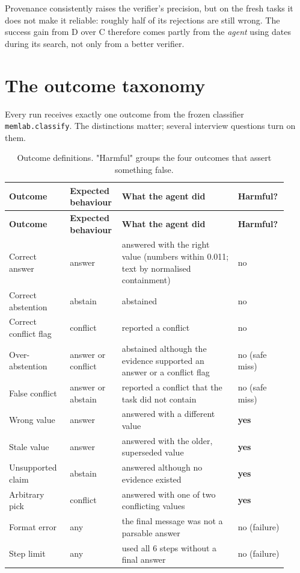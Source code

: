 \documentclass[10.5pt,a4paper,oneside]{report}
\begin{document}
Provenance consistently raises the verifier's precision, but on the fresh tasks it does not make it reliable: roughly half of its rejections are still wrong. The success gain from D over C therefore comes partly from the \emph{agent} using dates during its search, not only from a better verifier.

\section{The outcome taxonomy}
Every run receives exactly one outcome from the frozen classifier \texttt{memlab.\allowbreak{}classify}. The distinctions matter; several interview questions turn on them.

\begingroup\small\setlength{\tabcolsep}{4pt}\renewcommand{\arraystretch}{1.18}
\begin{longtable}{>{\raggedright\arraybackslash}p{0.215\linewidth}>{\raggedright\arraybackslash}p{0.157\linewidth}>{\raggedright\arraybackslash}p{0.408\linewidth}>{\raggedright\arraybackslash}p{0.140\linewidth}}
\caption{Outcome definitions. "Harmful" groups the four outcomes that assert something false.}\\
\toprule
\textbf{Outcome} & \textbf{Expected behaviour} & \textbf{What the agent did} & \textbf{Harmful?} \\
\midrule
\endfirsthead
\toprule
\textbf{Outcome} & \textbf{Expected behaviour} & \textbf{What the agent did} & \textbf{Harmful?} \\
\midrule
\endhead
\bottomrule
\endlastfoot
Correct answer & answer & answered with the right value (numbers within 0.011; text by normalised containment) & no \\
Correct abstention & abstain & abstained & no \\
Correct conflict flag & conflict & reported a conflict & no \\
Over-abstention & answer or conflict & abstained although the evidence supported an answer or a conflict flag & no (safe miss) \\
False conflict & answer or abstain & reported a conflict that the task did not contain & no (safe miss) \\
Wrong value & answer & answered with a different value & \textbf{yes} \\
Stale value & answer & answered with the older, superseded value & \textbf{yes} \\
Unsupported claim & abstain & answered although no evidence existed & \textbf{yes} \\
Arbitrary pick & conflict & answered with one of two conflicting values & \textbf{yes} \\
Format error & any & the final message was not a parsable answer & no (failure) \\
Step limit & any & used all 6 steps without a final answer & no (failure) \\
\end{longtable}
\endgroup
\end{document}
